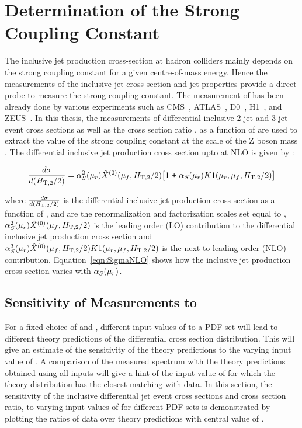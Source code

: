 \chapter{Determination of the Strong Coupling Constant}
\label{sec:Fits}
The inclusive jet production cross-section at hadron colliders mainly depends on the strong coupling constant \alps for a given centre-of-mass energy. Hence the measurements of the inclusive jet cross section and jet properties provide a direct probe to measure the strong coupling constant. The measurement of \alps has been already done by various experiments such as CMS~\cite{Chatrchyan:2013txa, Chatrchyan:2013haa, Khachatryan:2014waa, CMS:2014mna, Khachatryan:2016mlc}, ATLAS~\cite{ATLAS:2015yaa}, D0~\cite{Abazov:2009nc, Abazov:2012lua}, H1~\cite{Andreev:2014wwa, Andreev:2016tgi}, and ZEUS~\cite{Abramowicz:2012jz}. In this thesis, the measurements of differential inclusive 2-jet and 3-jet event cross sections as well as the cross section ratio \ratio, as a function of \httwo are used to extract the value of the strong coupling constant at  the  scale  of  the  Z boson mass \alpsmz. The differential inclusive jet production cross section upto at NLO is given by \cite{Affolder:2001hn}:

 \begin{equation}
 \frac{d\sigma}{d(\httwo)} = \alpha_S^2(\mur)\hat{X}^{(0)}(\muf,\httwo)\big[1~\plus \alpha_S(\mur)K1(\mur, \muf,\httwo)\big]
 \label{eqn:SigmaNLO}
 \end{equation}

 where $\frac{d\sigma}{d(\httwo)}$ is the differential inclusive jet production cross section as a function of \httwo, \mur and \muf are the renormalization and factorization scales set equal to \httwo, $\alpha_S^2(\mu_r)\hat{X}^{(0)}(\mu_f,H_{\mathrm{T,2}}/2)$ is the leading order (LO) contribution to the differential inclusive jet production cross section and $\alpha_S^3(\mu_r)\hat{X}^{(0)}(\mu_f,H_{\mathrm{T,2}}/2)K1(\mu_r, \mu_f,H_{\mathrm{T,2}}/2)$ is the next-to-leading order (NLO) contribution. Equation~\ref{eqn:SigmaNLO} shows how the inclusive jet production cross section varies with $\alpha_S(\mu_r)$. 
 
\section{Sensitivity of Measurements to \texorpdfstring{\alpsmz}{alpha-S(M(Z))}}
\label{sec:sensitivity}
 
For a fixed choice of \mur and \muf, different input values of \alpsmz to a PDF set will lead to different theory predictions of the differential cross section distribution. This will give an estimate of the sensitivity of the theory predictions to the varying input value of \alpsmz. A comparison of the measured spectrum with the theory predictions obtained using all \alpsmz inputs will give a hint of the input value of \alpsmz for which the theory distribution has the closest matching with data. In this section, the sensitivity of the inclusive differential jet event cross sections and cross section ratio, \ratio to varying input values of \alpsmz for different PDF sets is demonstrated by plotting the ratios of data over theory predictions with central value of \alpsmz.

